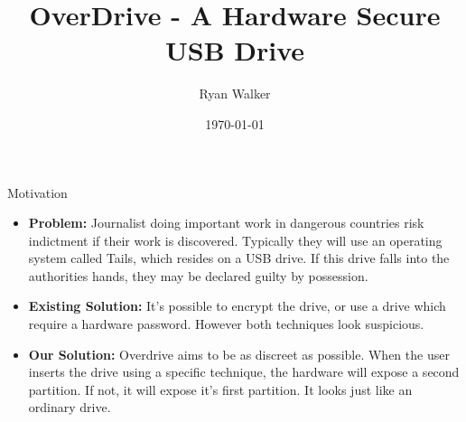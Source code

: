 \documentclass[aspectratio=169]{beamer}
\title{OverDrive - A Hardware Secure USB Drive}
\date{\today}
\author{Ryan Walker}
\institute{}
\begin{document}
\maketitle

\begin{frame}{Motivation}
\begin{itemize}
\item \textbf{Problem:}
	Journalist doing important work in dangerous countries risk indictment if their work is 
    discovered. Typically they will use an operating system called Tails, which resides on
    a USB drive. If this drive falls into the authorities hands, they may be declared guilty
    by possession.

\item \textbf{Existing Solution:}
   It's possible to encrypt the drive, or use a drive which require a hardware password.
   However both techniques look suspicious.

\item \textbf{Our Solution:}
    Overdrive aims to be as discreet as possible. When the user inserts the drive using a specific
    technique, the hardware will expose a second partition. If not, it will expose it's first
    partition. It looks just like an ordinary drive.
\end{itemize}
\end{frame}
\end{document}

